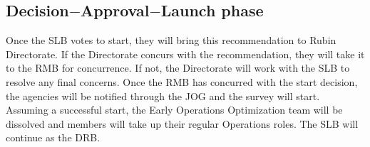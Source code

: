 \subsection{Decision$-$Approval$-$Launch phase}
Once the SLB votes to start, they will bring this recommendation to Rubin Directorate. If the Directorate concurs with the recommendation, they will take it to the RMB for concurrence. If not, the Directorate will work with the SLB to resolve any final concerns. Once the RMB has concurred with the start decision, the agencies will be notified through the JOG and the survey will start. Assuming a successful start, the Early Operations Optimization team will be dissolved and members will take up their regular Operations roles. The SLB will continue as the DRB. 

